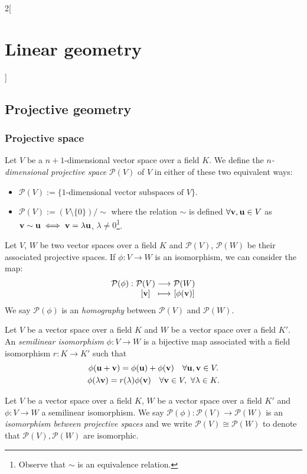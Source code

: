\documentclass[../../../main_math.tex]{subfiles}
\begin{document}
\begin{multicols}{2}[\section{Linear geometry}]
  \subsection{Projective geometry}
  \subsubsection{Projective space}
  \begin{definition}
    Let $V$ be a $n+1$-dimensional vector space over a field $K$. We define the \emph{$n$-dimensional projective space} $\mathcal{P}(V)$ of $V$ in either of these two equivalent ways:
    \begin{itemize}
      \item $\displaystyle\mathcal{P}(V):=\{\text{1-dimensional vector subspaces of $V$}\}$.
      \item $\displaystyle\mathcal{P}(V):=(V\setminus\{0\})/\sim$ where the relation $\sim$ is defined $\forall\boldsymbol{\mathrm{v}},\boldsymbol{\mathrm{u}}\in V$ as $\boldsymbol{\mathrm{v}}\sim \boldsymbol{\mathrm{u}}\iff \boldsymbol{\mathrm{v}}=\lambda \boldsymbol{\mathrm{u}}$, $\lambda\ne 0$\footnote{Observe that $\sim$ is an equivalence relation.}.
    \end{itemize}
  \end{definition}
  \begin{definition}
    Let $V$, $W$ be two vector spaces over a field $K$ and $\mathcal{P}(V)$, $\mathcal{P}(W)$ be their associated projective spaces. If $\phi:V\rightarrow W$ is an isomorphism, we can consider the map:
    $$\function{\mathcal{P}(\phi)}{\mathcal{P}(V)}{\mathcal{P}(W)}{[\vf{v}] }{[\phi(\vf{v})]}$$
    We say $\mathcal{P}(\phi)$ is an \emph{homography} between $\mathcal{P}(V)$ and $\mathcal{P}(W)$.
  \end{definition}
  \begin{definition}
    Let $V$ be a vector space over a field $K$ and $W$ be a vector space over a field $K'$. An \emph{semilinear isomorphism} $\phi:V\rightarrow W$ is a bijective map associated with a field isomorphism $r:K\rightarrow K'$ such that
    \begin{gather*}
      \phi(\boldsymbol{\mathrm{u}}+\boldsymbol{\mathrm{v}})=\phi(\boldsymbol{\mathrm{u}})+\phi(\boldsymbol{\mathrm{v}})\quad \forall \boldsymbol{\mathrm{u}},\boldsymbol{\mathrm{v}}\in V.\\
      \phi(\lambda \boldsymbol{\mathrm{v}})=r(\lambda)\phi(\boldsymbol{\mathrm{v}})\quad \forall \boldsymbol{\mathrm{v}}\in V,\ \forall\lambda\in K.
    \end{gather*}
  \end{definition}
  \begin{definition}
    Let $V$ be a vector space over a field $K$, $W$ be a vector space over a field $K'$ and $\phi:V\rightarrow W$ a semilinear isomorphism. We say $\mathcal{P}(\phi):\mathcal{P}(V)\rightarrow\mathcal{P}(W)$ is an \emph{isomorphism between projective spaces} and we write $\mathcal{P}(V)\cong \mathcal{P}(W)$ to denote that $\mathcal{P}(V),\mathcal{P}(W)$ are isomorphic.

\end{definition}
\end{multicols}
\end{document}
